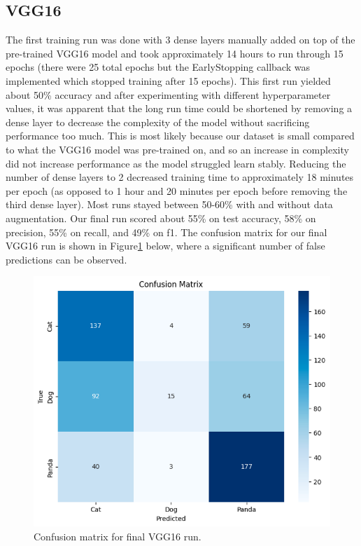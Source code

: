 \subsection{VGG16}
The first training run was done with 3 dense layers manually added on top of the pre-trained VGG16 model and took approximately 14 hours to run through 15 epochs (there were 25 total epochs but the EarlyStopping callback was implemented which stopped training after 15 epochs). This first run yielded about 50\% accuracy and after experimenting with different hyperparameter values, it was apparent that the long run time could be shortened by removing a dense layer to decrease the complexity of the model without sacrificing performance too much. This is most likely because our dataset is small compared to what the VGG16 model was pre-trained on, and so an increase in complexity did not increase performance as the model struggled learn stably. Reducing the number of dense layers to 2 decreased training time to approximately 18 minutes per epoch (as opposed to 1 hour and 20 minutes per epoch before removing the third dense layer). Most runs stayed between 50-60\% with and without data augmentation. Our final run scored about 55\% on test accuracy, 58\% on precision, 55\% on recall, and 49\% on f1. The confusion matrix for our final VGG16 run is shown in Figure\ref{fig:figure5} below, where a significant number of false predictions can be observed. 

\begin{figure}[h]
	\centering
	\includegraphics[scale=0.5]{VGG16_cfm}
	\caption{Confusion matrix for final VGG16 run.}
	\label{fig:figure5}
\end{figure}